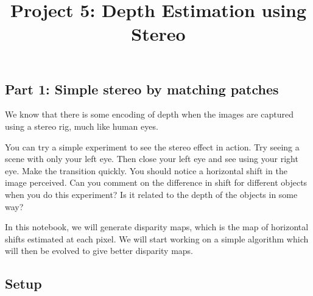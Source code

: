 \documentclass[
  letterpaper,
  DIV=11,
  numbers=noendperiod]{scrartcl}
\title{Project 5: Depth Estimation using Stereo}
\author{}
\date{}
\begin{document}
\maketitle
\ifdefined\Shaded\renewenvironment{Shaded}{\begin{tcolorbox}[boxrule=0pt, sharp corners, frame hidden, interior hidden, enhanced, borderline west={3pt}{0pt}{shadecolor}, breakable]}{\end{tcolorbox}}\fi

\hypertarget{part-1-simple-stereo-by-matching-patches}{%
\subsection{Part 1: Simple stereo by matching
patches}\label{part-1-simple-stereo-by-matching-patches}}

We know that there is some encoding of depth when the images are
captured using a stereo rig, much like human eyes.

You can try a simple experiment to see the stereo effect in action. Try
seeing a scene with only your left eye. Then close your left eye and see
using your right eye. Make the transition quickly. You should notice a
horizontal shift in the image perceived. Can you comment on the
difference in shift for different objects when you do this experiment?
Is it related to the depth of the objects in some way?

In this notebook, we will generate disparity maps, which is the map of
horizontal shifts estimated at each pixel. We will start working on a
simple algorithm which will then be evolved to give better disparity
maps.

\hypertarget{setup}{%
\subsection{Setup}\label{setup}}
\end{document}
